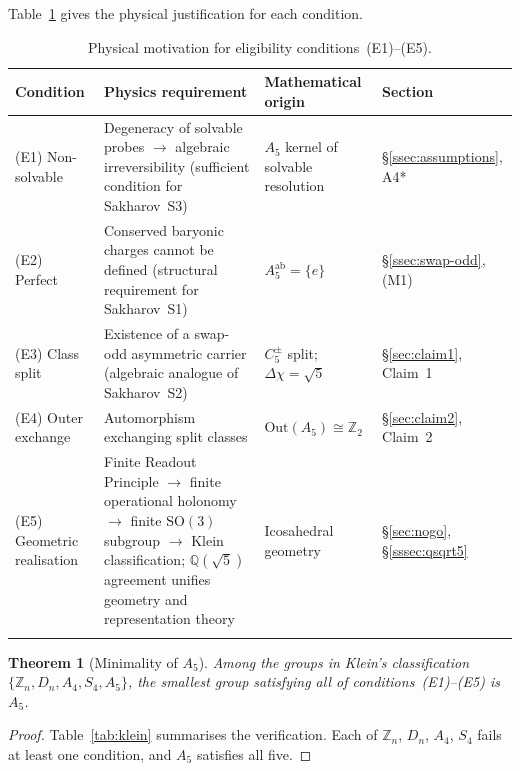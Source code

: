 \documentclass[sn-mathphys-num,Numbered]{sn-jnl}
\theoremstyle{thmstyleone}
\newtheorem{theorem}{Theorem}[section]
\theoremstyle{thmstylethree}
\theoremstyle{thmstyletwo}
\newcommand{\SO}{\mathrm{SO}}
\newcommand{\Qsqrt}{\mathbb{Q}(\sqrt{5})}
\begin{document}
Table~\ref{tab:eligibility} gives the physical justification for each
condition.

\begin{table}[h]
\caption{Physical motivation for eligibility conditions~(E1)--(E5).}
\label{tab:eligibility}
\begin{tabular}{@{}p{2cm}p{4cm}p{4cm}p{2.5cm}@{}}
\toprule
Condition & Physics requirement & Mathematical origin & Section \\
\midrule
(E1) Non-solvable &
  Degeneracy of solvable probes $\to$ algebraic irreversibility
  (sufficient condition for Sakharov~S3) &
  $A_5$ kernel of solvable resolution &
  \S\ref{ssec:assumptions}, A4* \\
(E2) Perfect &
  Conserved baryonic charges cannot be defined
  (structural requirement for Sakharov~S1) &
  $A_5^{\mathrm{ab}} = \{e\}$ &
  \S\ref{ssec:swap-odd}, (M1) \\
(E3) Class split &
  Existence of a swap-odd asymmetric carrier
  (algebraic analogue of Sakharov~S2) &
  $C_5^\pm$ split; $\Delta\chi = \sqrt{5}$ &
  \S\ref{sec:claim1}, Claim~1 \\
(E4) Outer exchange &
  Automorphism exchanging split classes &
  $\mathrm{Out}(A_5)\cong\mathbb{Z}_2$ &
  \S\ref{sec:claim2}, Claim~2 \\
(E5) Geometric realisation &
  Finite Readout Principle $\to$ finite operational holonomy $\to$ finite $\SO(3)$ subgroup $\to$
  Klein classification; $\Qsqrt$ agreement unifies geometry and
  representation theory &
  Icosahedral geometry &
  \S\ref{sec:nogo}, \S\ref{sssec:qsqrt5} \\
\botrule
\end{tabular}
\end{table}

\begin{theorem}[Minimality of $A_5$]
\label{thm:minimality}
Among the groups in Klein's classification
$\{\mathbb{Z}_n, D_n, A_4, S_4, A_5\}$, the smallest group satisfying
all of conditions~{\rm(E1)--(E5)} is $A_5$.
\end{theorem}

\begin{proof}
Table~\ref{tab:klein} summarises the verification.
Each of $\mathbb{Z}_n$, $D_n$, $A_4$, $S_4$ fails at least one
condition, and $A_5$ satisfies all five.
\end{proof}
\end{document}
